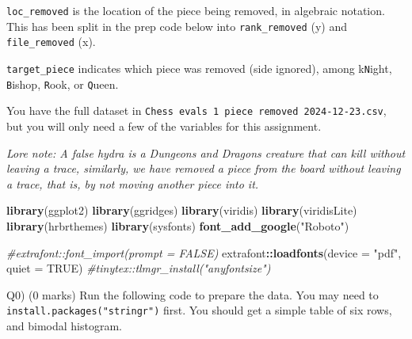 \documentclass[
]{article}
\newenvironment{Shaded}{\begin{snugshade}}{\end{snugshade}}
\newcommand{\AttributeTok}[1]{\textcolor[rgb]{0.13,0.29,0.53}{#1}}
\newcommand{\CommentTok}[1]{\textcolor[rgb]{0.56,0.35,0.01}{\textit{#1}}}
\newcommand{\ConstantTok}[1]{\textcolor[rgb]{0.56,0.35,0.01}{#1}}
\newcommand{\FunctionTok}[1]{\textcolor[rgb]{0.13,0.29,0.53}{\textbf{#1}}}
\newcommand{\NormalTok}[1]{#1}
\newcommand{\SpecialCharTok}[1]{\textcolor[rgb]{0.81,0.36,0.00}{\textbf{#1}}}
\newcommand{\StringTok}[1]{\textcolor[rgb]{0.31,0.60,0.02}{#1}}
\begin{document}
\texttt{loc\_removed} is the location of the piece being removed, in
algebraic notation. This has been split in the prep code below into
\texttt{rank\_removed} (y) and \texttt{file\_removed} (x).

\texttt{target\_piece} indicates which piece was removed (side ignored),
among k\texttt{N}ight, \texttt{B}ishop, \texttt{R}ook, or
\texttt{Q}ueen.

You have the full dataset in
\texttt{Chess\ evals\ 1\ piece\ removed\ 2024-12-23.csv}, but you will
only need a few of the variables for this assignment.

\emph{Lore note: A false hydra is a Dungeons and Dragons creature that
can kill without leaving a trace, similarly, we have removed a piece
from the board without leaving a trace, that is, by not moving another
piece into it.}

\begin{Shaded}
\begin{Highlighting}[]
\FunctionTok{library}\NormalTok{(ggplot2)}
\FunctionTok{library}\NormalTok{(ggridges)}
\FunctionTok{library}\NormalTok{(viridis)}
\FunctionTok{library}\NormalTok{(viridisLite)}
\FunctionTok{library}\NormalTok{(hrbrthemes)}
\FunctionTok{library}\NormalTok{(sysfonts)}
\FunctionTok{font\_add\_google}\NormalTok{(}\StringTok{"Roboto"}\NormalTok{)}

\CommentTok{\#extrafont::font\_import(prompt = FALSE)}
\NormalTok{extrafont}\SpecialCharTok{::}\FunctionTok{loadfonts}\NormalTok{(}\AttributeTok{device =} \StringTok{"pdf"}\NormalTok{, }\AttributeTok{quiet =} \ConstantTok{TRUE}\NormalTok{)}
\CommentTok{\#tinytex::tlmgr\_install("anyfontsize")}
\end{Highlighting}
\end{Shaded}

Q0) (0 marks) Run the following code to prepare the data. You may need
to \texttt{install.packages("stringr")} first. You should get a simple
table of six rows, and bimodal histogram.
\end{document}
